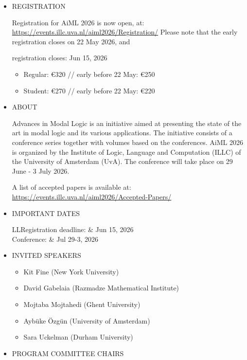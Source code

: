 \documentclass[prodmode,acmtecs]{acmsmall} %
\begin{document}
\begin{itemize}\item  REGISTRATION  
 
  Registration for AiML 2026 is now open, at: \href{https://events.illc.uva.nl/aiml2026/Registration/}{https://events.illc.uva.nl/aiml2026/Registration/} Please note that the early registration closes on 22 May 2026, and 
 
registration closes: Jun 15, 2026 
 
\begin{itemize}\item  Regular:  €320 // early before 22 May: €250
\item  Student:  €270 // early before 22 May: €220
\end{itemize} 
\item  ABOUT 
 
  Advances in Modal Logic is an initiative aimed at presenting the state of the art in modal logic and its various applications. The initiative consists of a conference series together with volumes based on the conferences. AiML 2026 is organized by the Institute of Logic, Language and Computation (ILLC) of the University of Amsterdam (UvA). The conference will take place on 29 June - 3 July 2026. 
 
  A list of accepted papers is available at: \href{https://events.illc.uva.nl/aiml2026/Accepted-Papers/}{https://events.illc.uva.nl/aiml2026/Accepted-Papers/} 
 
\item  IMPORTANT DATES 
 
\begin{tabulary}{\linewidth}{LL}Registration deadline:  & Jun 15, 2026 \\
Conference:  & Jul 29-3, 2026 \\
\end{tabulary}
 
\item  INVITED SPEAKERS 
 
\begin{itemize}\item  Kit Fine (New York University)
\item  David Gabelaia (Razmadze Mathematical Institute)
\item  Mojtaba Mojtahedi (Ghent University)
\item  Aybüke Özgün (University of Amsterdam)
\item  Sara Uckelman (Durham University)
\end{itemize} 
\item  PROGRAM COMMITTEE CHAIRS  
 

\end{itemize}
\end{document}
